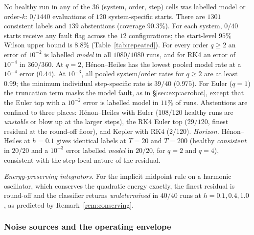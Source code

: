 \documentclass[10pt]{article}
\theoremstyle{definition}
\begin{document}
No healthy run in any of the $36$ (system, order, step) cells was labelled model or order-$k$:
$0/1440$ evaluations of $120$ system-specific starts. There are $1301$
consistent labels and $139$ abstentions (coverage $90.3\%$). For each system,
$0/40$ starts receive any fault flag across the $12$ configurations; the
start-level $95\%$ Wilson upper bound is $8.8\%$ (Table~\ref{tab:repeated}).
For every order $q\ge2$ an error of $10^{-2}$ is labelled
\emph{model} in all $1080/1080$ runs, and for RK4 an error of $10^{-4}$ in $360/360$. At $q=2$, H\'enon--Heiles has the lowest pooled model rate at a $10^{-4}$
error ($0.44$). At $10^{-3}$, all pooled system/order rates for $q\ge2$
are at least $0.99$; the minimum individual step-specific rate is
$39/40$ ($0.975$). For Euler ($q=1$) the
truncation term masks the model fault, as in \S\ref{sec:exp:acrobot}, except that the Euler top with a $10^{-2}$ error is labelled
model in $11\%$ of runs. Abstentions are confined to three places: H\'enon--Heiles with Euler ($108/120$ healthy runs are
\emph{unstable} or blow up at the larger steps), the RK4 Euler top ($29/120$, finest residual at the round-off floor), and Kepler
with RK4 ($2/120$). \emph{Horizon.} H\'enon--Heiles at $h=0.1$ gives identical labels at $T=20$ and $T=200$ (healthy
\emph{consistent} in $20/20$ and a $10^{-3}$ error labelled \emph{model} in $20/20$, for $q=2$ and $q=4$), consistent with the
step-local nature of the residual.

\emph{Energy-preserving integrators.} For the implicit midpoint rule on a
harmonic oscillator, which conserves the quadratic energy exactly, the finest
residual is round-off and the classifier returns \emph{undetermined} in $40/40$
runs at $h=0.1,0.4,1.0$, as predicted by Remark~\ref{rem:conserving}.

\subsubsection{Noise sources and the operating envelope}\label{sec:exp:noise}
\end{document}
